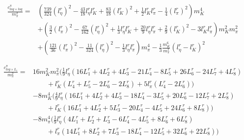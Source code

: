 \documentclass[12pt,a4paper]{article}
\begin{document}
\begin{align}
	\frac{c^{\pi}_{log \times log}}{m_{\pi}^2} =&  \left(\frac{739}{324}(l^r_{\eta})^2 - \frac{43}{18} l^r_{\eta} l^r_{K} + \frac{83}{18} (l^r_{K})^2 + \frac{1}{2} l^r_{K} l^r_{\pi} - \frac{1}{4} (l^r_{\pi})^2 \right) m_{K}^4 \nonumber \\
	& + \left( \frac{3}{2} (l^r_{\pi})^2 - \frac{67}{162} (l^r_{\eta})^2 + \frac{1}{3} l^r_{\eta} l^r_{K} +\frac{20}{9} l^r_{\eta} l^r_{\pi} + \frac{2}{9} (l^r_{K})^2 - 3 l^r_{K} l^r_{\pi} \right) m_{K}^2 m_{\pi}^2 \nonumber \\
	& + \left(\frac{121}{36} (l^r_{\pi})^2 - \frac{11}{324} (l^r_{\eta})^2 - \frac{1}{3} l^r_{\eta} l^r_{\pi} \right) m_{\pi}^4 -\frac{1}{3} \frac{m_K^6}{m_{\pi}^2} (l^r_{\eta}-l^r_{K})^2
\label{cloglogGMO}
\end{align}

\begin{align}
	\frac{c^{\pi}_{log \times L_{i}}}{m_{\pi}^2} =& 16 m_{K}^2 m_{\pi}^2 \bigg( \frac{1}{9} l^r_{\eta} (16 L^r_{1}+4 L^r_{2}+4 L^r_{3}-21 L^r_{4}-8 L^r_{5}+26 L^r_{6}-24 L^r_{7}+4 L^r_{8}) \nonumber \\
	& \qquad +l^r_{K} (L^r_{4}+L^r_{5}-2 L^r_{6}-2 L^r_{8})+5 l^r_{\pi} (L^r_{4}-2 L^r_{6})\bigg) \nonumber \\
	& -8 m_{K}^4 \bigg(\frac{4}{9} l^r_{\eta} (16 L^r_{1}+4 L^r_{2}+4 L^r_{3}-18 L^r_{4}-3 L^r_{5}+20 L^r_{6}-12 L^r_{7}+2 L^r_{8}) \nonumber \\
	& \qquad + l^r_{K} (16 L^r_{1}+4 L^r_{2}+5 L^r_{3}-20 L^r_{4}-4 L^r_{5}+24 L^r_{6}+8 L^r_{8}) \bigg) \nonumber \\
	& -8 m_{\pi}^4 \bigg(\frac{1}{9} l^r_{\eta} (4 L^r_{1}+L^r_{2}+L^r_{3}-6 L^r_{4}-4 L^r_{5}+8 L^r_{6}+6 L^r_{8}) \nonumber \\
	& \qquad + l^r_{\pi} (14 L^r_{1}+8 L^r_{2}+7 L^r_{3}-18 L^r_{4}-12 L^r_{5}+32 L^r_{6}+22 L^r_{8}) \bigg) \label{clogliGMO}
\end{align}
\end{document}
